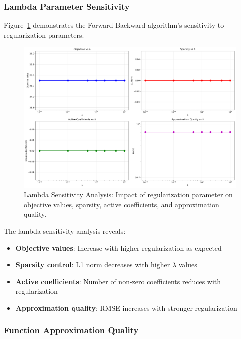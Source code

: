 \documentclass[11pt,a4paper]{article}
\begin{document}
\subsubsection{Lambda Parameter Sensitivity}

Figure~\ref{fig:task2_lambda} demonstrates the Forward-Backward algorithm's sensitivity to regularization parameters.

\begin{figure}[h]
\centering
\includegraphics[width=\textwidth]{../results/plots/task2_lambda_analysis.png}
\caption{Lambda Sensitivity Analysis: Impact of regularization parameter on objective values, sparsity, active coefficients, and approximation quality.}
\label{fig:task2_lambda}
\end{figure}

The lambda sensitivity analysis reveals:
\begin{itemize}
    \item \textbf{Objective values}: Increase with higher regularization as expected
    \item \textbf{Sparsity control}: L1 norm decreases with higher $\lambda$ values
    \item \textbf{Active coefficients}: Number of non-zero coefficients reduces with regularization
    \item \textbf{Approximation quality}: RMSE increases with stronger regularization
\end{itemize}

\subsubsection{Function Approximation Quality}
\end{document}
